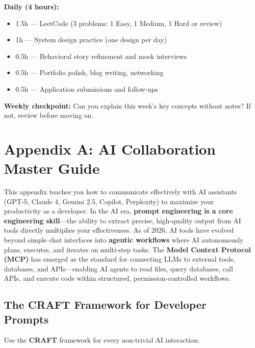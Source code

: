 \documentclass[11pt, a4paper, oneside]{report}
\begin{document}
\begin{practicebox}
\textbf{Daily (4 hours):}
\begin{itemize}[leftmargin=*]
\item 1.5h --- LeetCode (3 problems: 1 Easy, 1 Medium, 1 Hard or review)
\item 1h --- System design practice (one design per day)
\item 0.5h --- Behavioral story refinement and mock interviews
\item 0.5h --- Portfolio polish, blog writing, networking
\item 0.5h --- Application submissions and follow-ups
\end{itemize}


\textbf{Weekly checkpoint:} Can you explain this week's key concepts without notes? If not, review before moving on.
\end{practicebox}


\appendix

\clearpage
\chapter[AI Collaboration Guide]{Appendix A: AI Collaboration Master Guide}

This appendix teaches you how to communicate effectively with AI assistants (GPT-5, Claude 4, Gemini 2.5, Copilot, Perplexity) to maximize your productivity as a developer. In the AI era, \textbf{prompt engineering is a core engineering skill}---the ability to extract precise, high-quality output from AI tools directly multiplies your effectiveness. As of 2026, AI tools have evolved beyond simple chat interfaces into \textbf{agentic workflows} where AI autonomously plans, executes, and iterates on multi-step tasks. The \textbf{Model Context Protocol (MCP)} has emerged as the standard for connecting LLMs to external tools, databases, and APIs---enabling AI agents to read files, query databases, call APIs, and execute code within structured, permission-controlled workflows.

\section[CRAFT Framework]{The CRAFT Framework for Developer Prompts}

Use the \textbf{CRAFT} framework for every non-trivial AI interaction:
\end{document}
